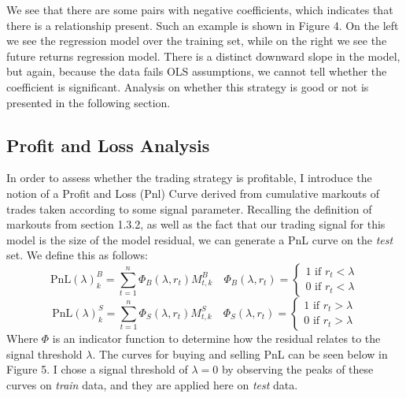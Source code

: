 \documentclass{article}
\begin{document}
We see that there are some pairs with negative coefficients, which indicates that 
there is a relationship present. Such an example is shown in Figure 4. On the left
we see the regression model over the training set, while on the right we see the 
future returns regression model. There is a distinct downward slope in the model, but 
again, because the data fails OLS assumptions, we cannot tell whether the coefficient
is significant. Analysis on whether this strategy is good or not is presented in the
following section.

\subsection{Profit and Loss Analysis}
In order to assess whether the trading strategy is profitable, I introduce the notion
of a Profit and Loss (Pnl) Curve derived from cumulative markouts of trades taken
according to some signal parameter. Recalling the definition of markouts from section
1.3.2, as well as the fact that our trading signal for this model is the size 
of the model residual, we can generate a PnL curve on the \textit{test} set.
We define this as follows:
$$\mathrm{PnL}(\lambda)_k^B = \sum_{t=1}^n \Phi_B(\lambda, r_t) M_{t,k}^B
\quad
\Phi_B(\lambda, r_t) = \begin{cases}
  1 \text { if } r_t < \lambda\\
  0 \text { if } r_t < \lambda  
\end{cases}$$
$$\mathrm{PnL}(\lambda)_k^S = \sum_{t=1}^n \Phi_S(\lambda, r_t) M_{t,k}^S
\quad
\Phi_S(\lambda, r_t) = \begin{cases}
  1 \text { if } r_t > \lambda\\
  0 \text { if } r_t > \lambda  
\end{cases}$$
Where $\Phi$ is an indicator function to determine how the residual relates to the
signal threshold $\lambda$. The curves for buying and selling PnL can be seen below
in Figure 5. I chose a signal threshold of $\lambda=0$ by observing the peaks
of these curves on \textit{train} data, and they are applied here on \textit{test}
data.
\end{document}
